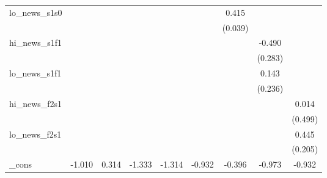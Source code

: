 {\begin{tabular}{l*{8}{c}}
\addlinespace
lo\_news\_s1s0&                     &                     &                     &                     &                     &       0.415\sym{***}&                     &                     \\
            &                     &                     &                     &                     &                     &     (0.039)         &                     &                     \\
\addlinespace
hi\_news\_s1f1&                     &                     &                     &                     &                     &                     &      -0.490\sym{*}  &                     \\
            &                     &                     &                     &                     &                     &                     &     (0.283)         &                     \\
\addlinespace
lo\_news\_s1f1&                     &                     &                     &                     &                     &                     &       0.143         &                     \\
            &                     &                     &                     &                     &                     &                     &     (0.236)         &                     \\
\addlinespace
hi\_news\_f2s1&                     &                     &                     &                     &                     &                     &                     &       0.014         \\
            &                     &                     &                     &                     &                     &                     &                     &     (0.499)         \\
\addlinespace
lo\_news\_f2s1&                     &                     &                     &                     &                     &                     &                     &       0.445\sym{**} \\
            &                     &                     &                     &                     &                     &                     &                     &     (0.205)         \\
\addlinespace
\_cons      &      -1.010\sym{*}  &       0.314         &      -1.333\sym{***}&      -1.314\sym{***}&      -0.932\sym{***}&      -0.396\sym{***}&      -0.973\sym{***}&      -0.932\sym{***}\\

\end{tabular}}
